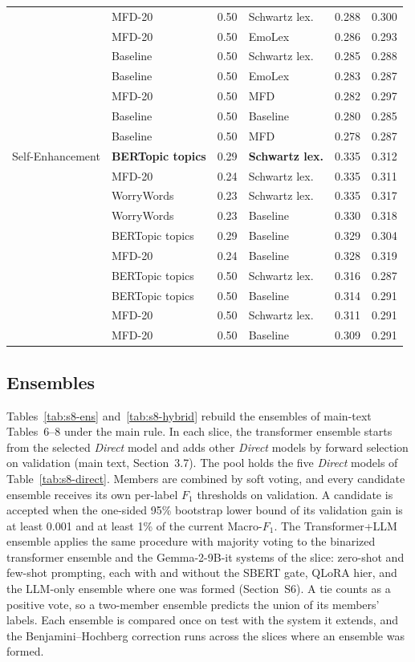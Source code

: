 {\begin{longtable}{llclcc}
 & MFD-20 & 0.50 & Schwartz lex. & 0.288 & 0.300 \\
 & MFD-20 & 0.50 & EmoLex & 0.286 & 0.293 \\
 & Baseline & 0.50 & Schwartz lex. & 0.285 & 0.288 \\
 & Baseline & 0.50 & EmoLex & 0.283 & 0.287 \\
 & MFD-20 & 0.50 & MFD & 0.282 & 0.297 \\
 & Baseline & 0.50 & Baseline & 0.280 & 0.285 \\
 & Baseline & 0.50 & MFD & 0.278 & 0.287 \\
Self-Enhancement & \textbf{BERTopic topics} & 0.29 & \textbf{Schwartz lex.} & 0.335 & 0.312 \\
 & MFD-20 & 0.24 & Schwartz lex. & 0.335 & 0.311 \\
 & WorryWords & 0.23 & Schwartz lex. & 0.335 & 0.317 \\
 & WorryWords & 0.23 & Baseline & 0.330 & 0.318 \\
 & BERTopic topics & 0.29 & Baseline & 0.329 & 0.304 \\
 & MFD-20 & 0.24 & Baseline & 0.328 & 0.319 \\
 & BERTopic topics & 0.50 & Schwartz lex. & 0.316 & 0.287 \\
 & BERTopic topics & 0.50 & Baseline & 0.314 & 0.291 \\
 & MFD-20 & 0.50 & Schwartz lex. & 0.311 & 0.291 \\
 & MFD-20 & 0.50 & Baseline & 0.309 & 0.291 \\
\end{longtable}
}


\subsection{Ensembles}
\label{sec:s8-ensembles}

Tables~\ref{tab:s8-ens} and~\ref{tab:s8-hybrid} rebuild the ensembles of main-text Tables~6--8 under the main rule. In each slice, the transformer ensemble starts from the selected \emph{Direct} model and adds other \emph{Direct} models by forward selection on validation (main text, Section~3.7). The pool holds the five \emph{Direct} models of Table~\ref{tab:s8-direct}. Members are combined by soft voting, and every candidate ensemble receives its own per-label $F_1$ thresholds on validation. A candidate is accepted when the one-sided 95\% bootstrap lower bound of its validation gain is at least 0.001 and at least 1\% of the current Macro-$F_1$. The Transformer+LLM ensemble applies the same procedure with majority voting to the binarized transformer ensemble and the Gemma-2-9B-it systems of the slice: zero-shot and few-shot prompting, each with and without the SBERT gate, QLoRA hier, and the LLM-only ensemble where one was formed (Section~S6). A tie counts as a positive vote, so a two-member ensemble predicts the union of its members' labels. Each ensemble is compared once on test with the system it extends, and the Benjamini--Hochberg correction runs across the slices where an ensemble was formed.

